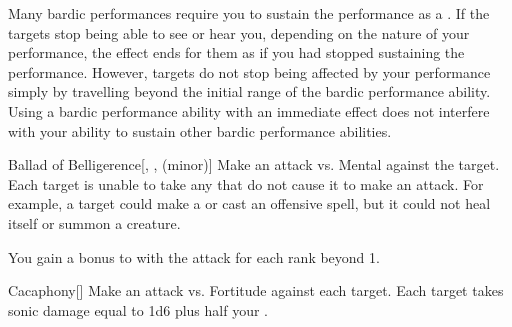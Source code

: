         Many bardic performances require you to sustain the performance as a .
        If the targets stop being able to see or hear you, depending on the nature of your performance, the effect ends for them as if you had stopped sustaining the performance.
        However, targets do not stop being affected by your performance simply by travelling beyond the initial range of the bardic performance ability.
        Using a bardic performance ability with an immediate effect does not interfere with your ability to sustain other bardic performance abilities.
        {
            \begin{freeability}{Ballad of Belligerence}[, ,  (minor)]
                Make an attack vs. Mental against the target.
                \hit Each target is unable to take any  that do not cause it to make an attack.
                For example, a target could make a  or cast an offensive spell, but it could not heal itself or summon a creature.

                \rankline
                You gain a  bonus to  with the attack for each rank beyond 1.
            \end{freeability}

            \begin{freeability}{Cacaphony}[]
                Make an attack vs. Fortitude against each target.
                \hit Each target takes sonic damage equal to 1d6 plus half your .


\end{freeability}}
